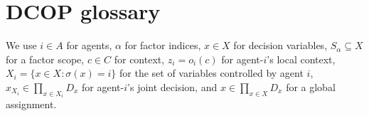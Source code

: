 \appendix

\section{DCOP glossary}
\label{sec:glossary}


We use $i\in A$ for agents, $\alpha$ for factor indices, $x\in X$ for decision variables, $S_\alpha\subseteq X$ for a factor scope, $c\in C$ for context, $z_i=o_i(c)$ for agent-$i$'s local context, $X_i=\{x\in X:\sigma(x)=i\}$ for the set of variables controlled by agent $i$, $x_{X_i}\in\prod_{x\in X_i} D_x$ for agent-$i$'s joint decision, and $x\in\prod_{x\in X} D_x$ for a global assignment.


